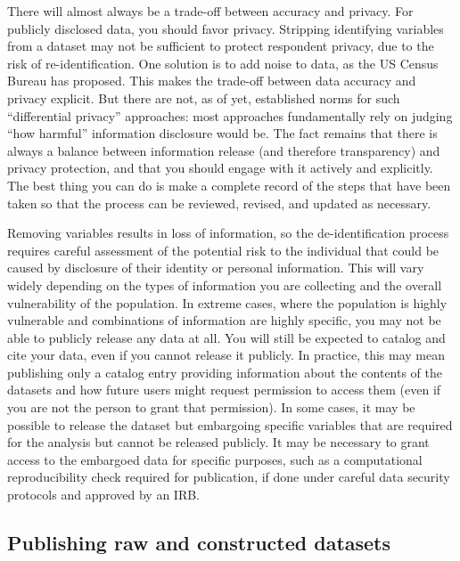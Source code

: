 There will almost always be a trade-off between accuracy and privacy.
For publicly disclosed data, you should favor privacy.
Stripping identifying variables from a dataset may not be sufficient to protect respondent privacy,
due to the risk of re-identification.
One solution is to add noise to data, as the US Census Bureau has proposed.\cite{abowd2018us}
This makes the trade-off between data accuracy and privacy explicit.
But there are not, as of yet, established norms for such ``differential privacy'' approaches:
most approaches fundamentally rely on judging ``how harmful'' information disclosure would be.
The fact remains that there is always a balance between information release (and therefore transparency)
and privacy protection, and that you should engage with it actively and explicitly.
The best thing you can do is make a complete record of the steps that have been taken
so that the process can be reviewed, revised, and updated as necessary.

Removing variables results in loss of information, so the de-identification process
requires careful assessment of the potential risk to the individual
that could be caused by disclosure of their identity or personal information.
This will vary widely depending on the types of information
you are collecting and the overall vulnerability of the population.
In extreme cases, where the population is highly vulnerable
and combinations of information are highly specific,
you may not be able to publicly release any data at all.
You will still be expected to catalog and cite your data,
even if you cannot release it publicly.
In practice, this may mean publishing only a catalog entry
providing information about the contents of the datasets
and how future users might request permission to access them
(even if you are not the person to grant that permission).
In some cases, it may be possible to release the dataset but 
embargoing specific variables that are required for the analysis but cannot be released publicly.
It may be necessary to grant access to the embargoed data for specific purposes,
such as a computational reproducibility check required for publication,
if done under careful data security protocols and approved by an IRB.

\subsection{Publishing raw and constructed datasets}


